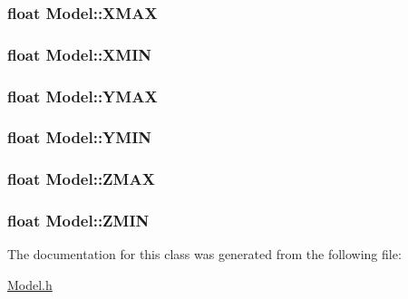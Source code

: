 \subsubsection[{\texorpdfstring{X\+M\+AX}{XMAX}}]{\setlength{\rightskip}{0pt plus 5cm}float Model\+::\+X\+M\+AX}\hypertarget{classModel_a887214a8f563973cb0372e2208434604}{}\label{classModel_a887214a8f563973cb0372e2208434604}
\subsubsection[{\texorpdfstring{X\+M\+IN}{XMIN}}]{\setlength{\rightskip}{0pt plus 5cm}float Model\+::\+X\+M\+IN}\hypertarget{classModel_aa82ab530b0a822fbaadb1261e6aee6da}{}\label{classModel_aa82ab530b0a822fbaadb1261e6aee6da}
\subsubsection[{\texorpdfstring{Y\+M\+AX}{YMAX}}]{\setlength{\rightskip}{0pt plus 5cm}float Model\+::\+Y\+M\+AX}\hypertarget{classModel_a53e3a94533cc9161cdfd9c4a689d167f}{}\label{classModel_a53e3a94533cc9161cdfd9c4a689d167f}
\subsubsection[{\texorpdfstring{Y\+M\+IN}{YMIN}}]{\setlength{\rightskip}{0pt plus 5cm}float Model\+::\+Y\+M\+IN}\hypertarget{classModel_a8cebe48c5f510c12e78d6f343ad78834}{}\label{classModel_a8cebe48c5f510c12e78d6f343ad78834}
\subsubsection[{\texorpdfstring{Z\+M\+AX}{ZMAX}}]{\setlength{\rightskip}{0pt plus 5cm}float Model\+::\+Z\+M\+AX}\hypertarget{classModel_a85b8f4656dc00fabded57052410979c1}{}\label{classModel_a85b8f4656dc00fabded57052410979c1}
\subsubsection[{\texorpdfstring{Z\+M\+IN}{ZMIN}}]{\setlength{\rightskip}{0pt plus 5cm}float Model\+::\+Z\+M\+IN}\hypertarget{classModel_abaee6b7a00cb309bf646b5aaaa39f7d5}{}\label{classModel_abaee6b7a00cb309bf646b5aaaa39f7d5}


The documentation for this class was generated from the following file\+:\begin{DoxyCompactItemize}
\item 
\hyperlink{Model_8h}{Model.\+h}\end{DoxyCompactItemize}
